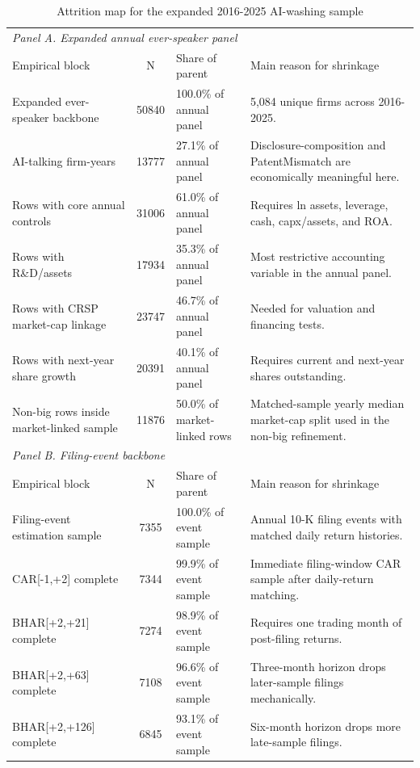 \begin{table}[!htbp]
\centering
\caption{Attrition map for the expanded 2016-2025 AI-washing sample}
\begin{tabular}{p{4.0cm}cp{2.8cm}p{7.0cm}}
\hline
\multicolumn{4}{l}{\textit{Panel A. Expanded annual ever-speaker panel}} \\
Empirical block & N & Share of parent & Main reason for shrinkage \\
Expanded ever-speaker backbone & 50840 & 100.0\% of annual panel & 5,084 unique firms across 2016-2025. \\
AI-talking firm-years & 13777 & 27.1\% of annual panel & Disclosure-composition and PatentMismatch are economically meaningful here. \\
Rows with core annual controls & 31006 & 61.0\% of annual panel & Requires ln assets, leverage, cash, capx/assets, and ROA. \\
Rows with R\&D/assets & 17934 & 35.3\% of annual panel & Most restrictive accounting variable in the annual panel. \\
Rows with CRSP market-cap linkage & 23747 & 46.7\% of annual panel & Needed for valuation and financing tests. \\
Rows with next-year share growth & 20391 & 40.1\% of annual panel & Requires current and next-year shares outstanding. \\
Non-big rows inside market-linked sample & 11876 & 50.0\% of market-linked rows & Matched-sample yearly median market-cap split used in the non-big refinement. \\
\multicolumn{4}{l}{\textit{Panel B. Filing-event backbone}} \\
Empirical block & N & Share of parent & Main reason for shrinkage \\
Filing-event estimation sample & 7355 & 100.0\% of event sample & Annual 10-K filing events with matched daily return histories. \\
CAR[-1,+2] complete & 7344 & 99.9\% of event sample & Immediate filing-window CAR sample after daily-return matching. \\
BHAR[+2,+21] complete & 7274 & 98.9\% of event sample & Requires one trading month of post-filing returns. \\
BHAR[+2,+63] complete & 7108 & 96.6\% of event sample & Three-month horizon drops later-sample filings mechanically. \\
BHAR[+2,+126] complete & 6845 & 93.1\% of event sample & Six-month horizon drops more late-sample filings. \\

\end{tabular}
\end{table}
